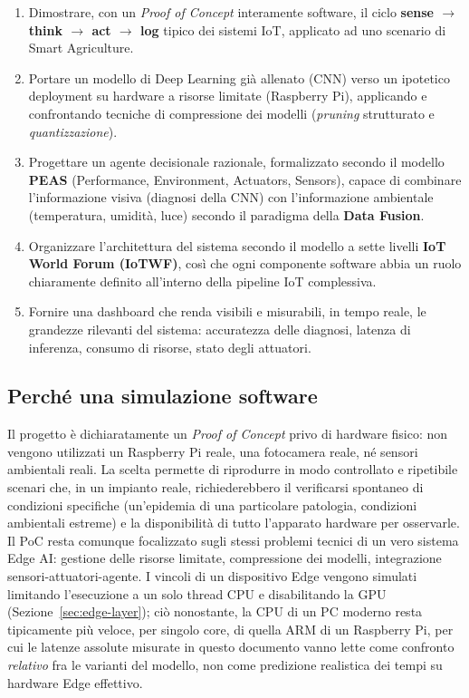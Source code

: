 \begin{enumerate}
    \item Dimostrare, con un \emph{Proof of Concept} interamente software, il
    ciclo \textbf{sense $\rightarrow$ think $\rightarrow$ act $\rightarrow$ log}
    tipico dei sistemi IoT, applicato ad uno scenario di Smart Agriculture.
    \item Portare un modello di Deep Learning già allenato (CNN) verso un
    ipotetico deployment su hardware a risorse limitate (Raspberry Pi),
    applicando e confrontando tecniche di compressione dei modelli
    (\emph{pruning} strutturato e \emph{quantizzazione}).
    \item Progettare un agente decisionale razionale, formalizzato secondo il
    modello \textbf{PEAS} (Performance, Environment, Actuators, Sensors),
    capace di combinare l'informazione visiva (diagnosi della CNN) con
    l'informazione ambientale (temperatura, umidità, luce) secondo il
    paradigma della \textbf{Data Fusion}.
    \item Organizzare l'architettura del sistema secondo il modello a sette
    livelli \textbf{IoT World Forum (IoTWF)}, così che ogni componente
    software abbia un ruolo chiaramente definito all'interno della pipeline
    IoT complessiva.
    \item Fornire una dashboard che renda
    visibili e misurabili, in tempo reale, le grandezze rilevanti del
    sistema: accuratezza delle diagnosi, latenza di inferenza, consumo di
    risorse, stato degli attuatori.
\end{enumerate}

\subsection{Perché una simulazione software}
Il progetto è dichiaratamente un \emph{Proof of Concept} privo di hardware
fisico: non vengono utilizzati un Raspberry Pi reale, una fotocamera reale,
né sensori ambientali reali. La scelta permette di riprodurre in modo
controllato e ripetibile scenari che, in un impianto reale, richiederebbero
il verificarsi spontaneo di condizioni specifiche (un'epidemia di una
particolare patologia, condizioni ambientali estreme) e la disponibilità
di tutto l'apparato hardware per osservarle. Il PoC resta comunque
focalizzato sugli stessi problemi tecnici di un vero sistema Edge AI:
gestione delle risorse limitate, compressione dei modelli, integrazione
sensori-attuatori-agente. I vincoli di un dispositivo Edge vengono simulati
limitando l'esecuzione a un solo thread CPU e disabilitando la GPU
(Sezione~\ref{sec:edge-layer}); ciò nonostante, la CPU di un PC moderno
resta tipicamente più veloce, per singolo core, di quella ARM di un
Raspberry Pi, per cui le latenze assolute misurate in questo documento vanno
lette come confronto \emph{relativo} fra le varianti del modello, non come
predizione realistica dei tempi su hardware Edge effettivo.


